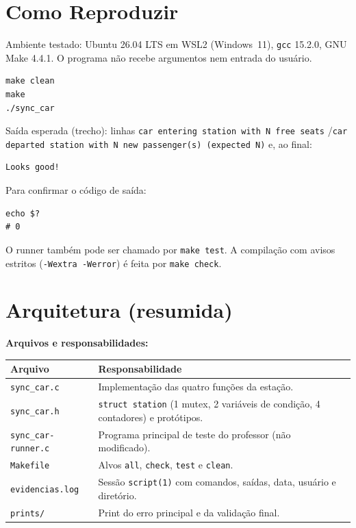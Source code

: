 \documentclass[11pt,a4paper]{article}
\begin{document}
\section{Como Reproduzir}

Ambiente testado: Ubuntu 26.04 LTS em WSL2 (Windows~11), \texttt{gcc} 15.2.0,
GNU Make 4.4.1. O programa não recebe argumentos nem entrada do usuário.

\begin{lstlisting}
make clean
make
./sync_car
\end{lstlisting}

Saída esperada (trecho): linhas \texttt{car entering station with N free seats}
/\texttt{car departed station with N new passenger(s) (expected N)} e, ao final:

\begin{lstlisting}
Looks good!
\end{lstlisting}

Para confirmar o código de saída:

\begin{lstlisting}
echo $?
# 0
\end{lstlisting}

O runner também pode ser chamado por \texttt{make test}. A compilação com
avisos estritos (\texttt{-Wextra -Werror}) é feita por \texttt{make check}.

\section{Arquitetura (resumida)}

\textbf{Arquivos e responsabilidades:}

\noindent\begin{tabularx}{\textwidth}{L{5.2cm} Y}
\toprule
\textbf{Arquivo} & \textbf{Responsabilidade} \\
\midrule
\texttt{sync\_car.c} & Implementação das quatro funções da estação. \\
\texttt{sync\_car.h} & \texttt{struct station} (1 mutex, 2 variáveis de condição, 4 contadores) e protótipos. \\
\texttt{sync\_car-runner.c} & Programa principal de teste do professor (não modificado). \\
\texttt{Makefile} & Alvos \texttt{all}, \texttt{check}, \texttt{test} e \texttt{clean}. \\
\texttt{evidencias.log} & Sessão \texttt{script(1)} com comandos, saídas, data, usuário e diretório. \\
\texttt{prints/} & Print do erro principal e da validação final. \\
\bottomrule
\end{tabularx}
\end{document}
